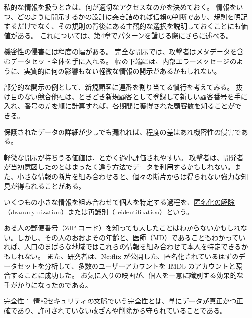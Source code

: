 \documentclass[uplatex]{jsarticle}
\def\label#1{}%
\begin{document}
私的な情報を扱うときは、何が適切なアクセスなのかを決めておく。
情報をいつ、どのように開示するかの設計は突き詰めれば信頼の判断であり、規則を明記するだけでなく、その規則の背後にある主観的な選択を説明しておくことにも価値がある。
これについては、第4章でパターンを論じる際にさらに述べる。

機密性の侵害には程度の幅がある。
完全な開示では、攻撃者はメタデータを含むデータセット全体を手に入れる。
幅の下端には、内部エラーメッセージのように、実質的に何の影響もない軽微な情報の開示があるかもしれない。

\begin{exa}[連番の顧客番号による部分的な開示]\label{exa:ch1-sequential-customer-numbers}
部分的な開示の例として、新規顧客に連番を割り当てる慣行を考えてみる。
抜け目のない競合他社は、ときどき新規顧客として登録して新しい顧客番号を手に入れ、番号の差を順に計算すれば、各期間に獲得された顧客数を知ることができる。
\end{exa}

保護されたデータの詳細が少しでも漏れれば、程度の差はあれ機密性の侵害である。

軽微な開示が持ちうる価値は、とかく過小評価されやすい。
攻撃者は、開発者が当初意図したのとはまったく違う方法でデータを利用するかもしれない。また、小さな情報の断片を組み合わせると、個々の断片からは得られない強力な知見が得られることがある。

\begin{dfn}\label{dfn:ch1-deanonymization}
いくつもの小さな情報を組み合わせて個人を特定する過程を、\underline{匿名化の解除}（deanonymization）または\underline{再識別}（reidentification）という。
\end{dfn}

\begin{exa}\label{exa:ch1-netflix-reidentification}
ある人の郵便番号（ZIP コード）を知っても大したことはわからないかもしれない。しかし、その人のおおよその年齢と、医師（MD）であることもわかっていれば、人口のまばらな地域ではこれらの情報を組み合わせて本人を特定できるかもしれない。
また、研究者は、Netflix が公開した、匿名化されているはずのデータセットを分析して、多数のユーザーアカウントを IMDb のアカウントと照合することに成功した。
お気に入りの映画が、個人を一意に識別する効果的な手がかりになったのである。
\end{exa}

\underline{完全性：}
情報セキュリティの文脈でいう完全性とは、単にデータが真正かつ正確であり、許可されていない改ざんや削除から守られていることである。
\end{document}
